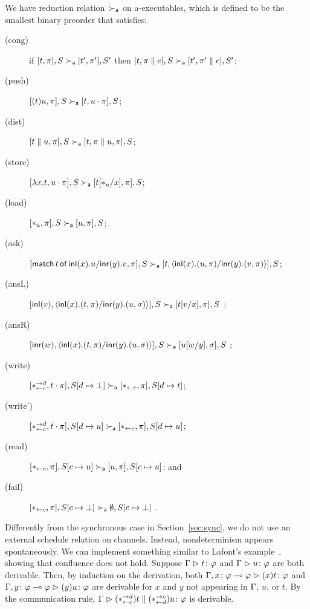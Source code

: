 We have reduction relation~$\ared$ on a-executables,
which is defined to be the smallest binary preorder
that satisfies:
\begin{description}
 \item[(cong)] if
	    $[t,\pi],         S \ared [ t',\pi'],        S'$
	    then
	    $[t,\pi \conc e], S \ared [ t',\pi'\conc e], S'$\enspace;
 \item[(push)]
	    $[(t)u,\pi],S       \ared [t,u\cdot\pi],S$;
 \item[(dist)]
	    $[t\conc u,\pi],S   \ared [t,\pi\conc u,\pi],S$\enspace;
 \item[(store)]
	    $[\lambda x.t,u\cdot\pi],S
	     \ared
	     [t[\ast_u/x],      \pi],S$\enspace;
 \item[(load)]
	    $[\ast_u,\pi],S\ared[u,\pi],S$\enspace;
 \item[(ask)]
      $[\mat t x u y v,\pi], S\ared [t,\mats x u \pi y v \pi], S$\enspace;
 \item[(ansL)]
      $[\inl{v}, \mats xt\pi yu\sigma],S \ared [t[v/x],\pi],S $ \enspace;
 \item[(ansR)]
      $[\inr{w}, \mats xt\pi yu\sigma],S \ared [u[w/y],\sigma],S $ \enspace;
 \item[(write)]
	    $
	    [\comod c{d}, t\cdot\pi], S[d\mapsto\bot]
	    \ared
	    [\reader c, \pi],
	    S[d\mapsto t]
	    $\enspace;
 \item[(write')]
	    $
	    [\comod c{d}, t\cdot\pi], S[d\mapsto u]
	    \ared
	    [\reader c, \pi],
	    S[d\mapsto u]
	    $\enspace;
 \item[(read)]$
	    [\reader c ,\pi],
	    S[c\mapsto u]
	    \ared
	    [u,\pi],
	    S[c\mapsto u]
	    $\enspace; and
 \item[(fail)]
	    $
	    [\reader c,\pi],
	    S[c\mapsto \bot]
	    \ared
	    \emptyset,S[c\mapsto \bot]
	    $
	    \enspace.
\end{description}
Differently from the synchronous case in Section~\ref{sec:sync},
we do not use an external schedule relation on channels.
Instead, nondeterminism appears spontaneously.
We can implement something similar to Lafont's example~\citep[B.1]{girard1989proofs},
showing that confluence does not hold.
Suppose $\G\tr\tj t\phi$ and $\G\tr\tj u\phi$ are both derivable.
Then, by induction on the derivation,
both $\G,\tj x{\phi\limp\phi}\tr\tj{(x)t}\phi$
and $\G,\tj y{\phi\limp\phi}\tr\tj{(y)u}\phi$ are derivable
for $x$ and $y$ not appearing in $\G$, $u$, or $t$.
By the communication rule,
$\G\tr\tj{(\comod c{d})t\conc(\comod {d} c)u}\phi$ is derivable.
